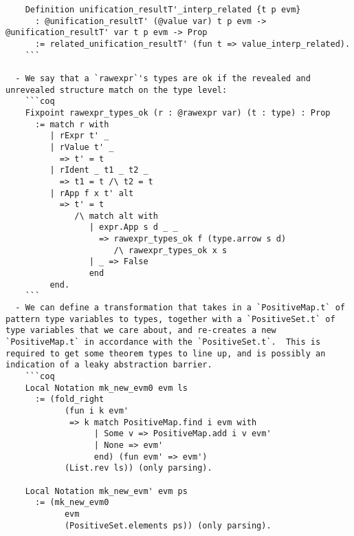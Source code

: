 \begin{itemize}
\begin{verbatim}
    Definition unification_resultT'_interp_related {t p evm}
      : @unification_resultT' (@value var) t p evm -> @unification_resultT' var t p evm -> Prop
      := related_unification_resultT' (fun t => value_interp_related).
    ```

  - We say that a `rawexpr`'s types are ok if the revealed and unrevealed structure match on the type level:
    ```coq
    Fixpoint rawexpr_types_ok (r : @rawexpr var) (t : type) : Prop
      := match r with
         | rExpr t' _
         | rValue t' _
           => t' = t
         | rIdent _ t1 _ t2 _
           => t1 = t /\ t2 = t
         | rApp f x t' alt
           => t' = t
              /\ match alt with
                 | expr.App s d _ _
                   => rawexpr_types_ok f (type.arrow s d)
                      /\ rawexpr_types_ok x s
                 | _ => False
                 end
         end.
    ```
  - We can define a transformation that takes in a `PositiveMap.t` of pattern type variables to types, together with a `PositiveSet.t` of type variables that we care about, and re-creates a new `PositiveMap.t` in accordance with the `PositiveSet.t`.  This is required to get some theorem types to line up, and is possibly an indication of a leaky abstraction barrier.
    ```coq
    Local Notation mk_new_evm0 evm ls
      := (fold_right
            (fun i k evm'
             => k match PositiveMap.find i evm with
                  | Some v => PositiveMap.add i v evm'
                  | None => evm'
                  end) (fun evm' => evm')
            (List.rev ls)) (only parsing).

    Local Notation mk_new_evm' evm ps
      := (mk_new_evm0
            evm
            (PositiveSet.elements ps)) (only parsing).


\end{verbatim}
\end{itemize}
